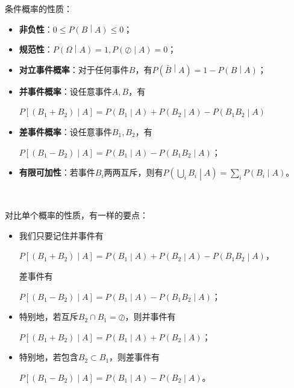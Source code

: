 条件概率的性质：
\begin{itemize}
    \item {\bf 非负性}：$0\leqslant P\left( B \middle| A \right) \leqslant 0$；
    \item {\bf 规范性}：$P\left( \varOmega \middle| A \right) =1,P\left( \oslash \middle| A \right) =0$；
    \item {\bf 对立事件概率}：对于任何事件$B$，有$P\left( \bar{B} \middle| A \right) =1-P\left( B \middle| A \right) $；
    \item {\bf 并事件概率}：设任意事件$A,B$，有
    
    $P\left[ \left( B_1+B_2 \right) \middle| A \right] =P\left( B_1 \middle| A \right) +P\left( B_2 \middle| A \right) -P\left( B_1B_2 \middle| A \right) $
    \item {\bf 差事件概率}：设任意事件$B_1,B_2$，有
    
    $P\left[ \left( B_1-B_2 \right) \middle| A \right] =P\left( B_1 \middle| A \right) -P\left( B_1B_2 \middle| A \right) $；
    \item {\bf 有限可加性}：若事件$B_i$两两互斥，则有$P\left( \bigcup_i{B_i} \middle| A \right) =\sum_i{P\left( B_i \middle| A \right)}$。
\end{itemize}

~

对比单个概率的性质，有一样的要点：
\begin{itemize}
    \item 我们只要记住并事件有
    
    $P\left[ \left( B_1+B_2 \right) \middle| A \right] =P\left( B_1 \middle| A \right) +P\left( B_2 \middle| A \right) -P\left( B_1B_2 \middle| A \right) $，
    
    差事件有
    
    $P\left[ \left( B_1-B_2 \right) \middle| A \right] =P\left( B_1 \middle| A \right) -P\left( B_1B_2 \middle| A \right) $；
    \item 特别地，若互斥$B_2\cap B_1=\oslash$，则并事件有
    
    $P\left[ \left( B_1+B_2 \right) \middle| A \right] =P\left( B_1 \middle| A \right) +P\left( B_2 \middle| A \right) $；
    \item 特别地，若包含$B_2\subset B_1$，则差事件有
    
    $P\left[ \left( B_1-B_2 \right) \middle| A \right] =P\left( B_1 \middle| A \right) -P\left( B_2 \middle| A \right) $。
\end{itemize}


